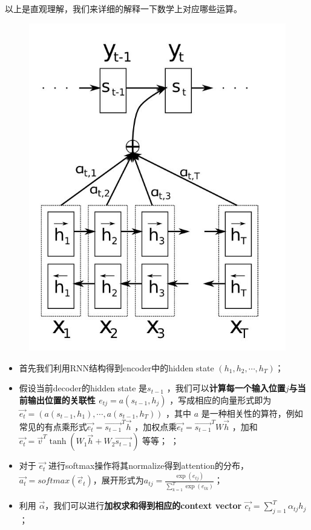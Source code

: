 \documentclass[12pt]{article}
\begin{document}
\begin{framed}
以上是直观理解，我们来详细的解释一下数学上对应哪些运算。
\begin{figure}[H]
    \centering
    \includegraphics[width=.6\textwidth]{fig/Attention_Math_Detail.jpg}
\end{figure}

\begin{itemize}
\setlength{\itemsep}{0pt}
\setlength{\parsep}{0pt}
\setlength{\parskip}{0pt}
    \item 首先我们利用RNN结构得到encoder中的hidden state $(h_1, h_2, \cdots, h_T)$；

    \item 假设当前decoder的hidden state 是$s_{t-1}$ ，我们可以\textbf{计算每一个输入位置$j$与当前输出位置的关联性 $e_{tj} = a(s_{t-1},h_j)$} ，写成相应的向量形式即为$\overrightarrow{e_t} = (a(s_{t-1},h_1), \cdots, a(s_{t-1},h_T))$ ，其中 $a$ 是一种相关性的算符，例如常见的有点乘形式$\overrightarrow{e_t} = \overrightarrow{s_{t-1}}^T\overrightarrow{h}$ ，加权点乘$\overrightarrow{e_t} = \overrightarrow{s_{t-1}}^TW\overrightarrow{h}$ ，加和$\overrightarrow{e_t} = \overrightarrow{v}^T\tanh(W_1\overrightarrow{h}+W_2\overrightarrow{s_{t-1}})$ 等等；
；

    \item 对于 $\overrightarrow{e_t} $ 进行softmax操作将其normalize得到attention的分布，$\overrightarrow{a_t} = softmax(\overrightarrow{e}_t)$，展开形式为$a_{tj} = \frac{\exp(e_{tj})}{\sum_{k=1}^T\exp(e_{tk})}$；

    \item 利用 $\overrightarrow{\alpha}$，我们可以进行\textbf{加权求和得到相应的context vector $\overrightarrow{c_t} = \sum_{j=1}^T\alpha_{tj}h_j$}；
    

\end{itemize}
\end{framed}
\end{document}
